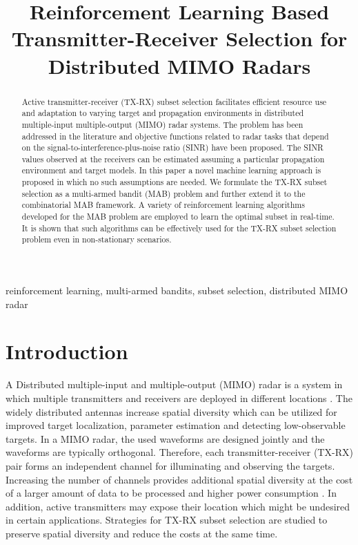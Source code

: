 \documentclass[conference]{IEEEtran}
\title{Reinforcement Learning Based Transmitter-Receiver Selection for Distributed MIMO Radars}
\author{
	\IEEEauthorblockN{
        Petteri~Pulkkinen,
	    Tuomas~Aittom\"aki, and
        Visa~Koivunen%
	}
	\IEEEauthorblockA{
		Department of Signal Processing and Acoustics, \\
		Aalto University \\
		PO Box 15400, FI-00076 Aalto, Finland \\
	}
}
\begin{document}
\maketitle

\begin{abstract}

Active transmitter-receiver (TX-RX) subset selection facilitates efficient resource use and adaptation to varying target and propagation environments in distributed multiple-input multiple-output (MIMO) radar systems.
The problem has been addressed in the literature and objective functions related to radar tasks that depend on the signal-to-interference-plus-noise ratio (SINR) have been proposed. 
The SINR values observed at the receivers can be estimated assuming a particular propagation environment and target models. 
In this paper a novel machine learning approach is proposed in which no such assumptions are needed.
We formulate the TX-RX subset selection as a multi-armed bandit (MAB) problem and further extend it to the combinatorial MAB framework.
A variety of reinforcement learning algorithms developed for the MAB problem are employed to learn the optimal subset in real-time.
It is shown that such algorithms can be effectively used for the TX-RX subset selection problem even in non-stationary scenarios.

\end{abstract}

\begin{IEEEkeywords}
reinforcement learning, multi-armed bandits, subset selection, distributed MIMO radar
\end{IEEEkeywords}


\section{Introduction}
\label{sec:intro}

A Distributed multiple-input and multiple-output (MIMO) radar is a system in which multiple transmitters and receivers are deployed in different locations \cite{Haimovich2008}.
The widely distributed antennas increase spatial diversity which can be utilized for improved target localization, parameter estimation and detecting low-observable targets.
In a MIMO radar, the used waveforms are designed jointly and the waveforms are typically orthogonal.
Therefore, each transmitter-receiver (TX-RX) pair forms an independent channel for illuminating and observing the targets.
Increasing the number of channels provides additional spatial diversity at the cost of a larger amount of data to be processed and higher power consumption \cite{Godrich2011, Sun2014, Aittomaeki2011}.
In addition, active transmitters may expose their location which might be undesired in certain applications.
Strategies for TX-RX subset selection are studied to preserve spatial diversity and reduce the costs at the same time.
\end{document}
